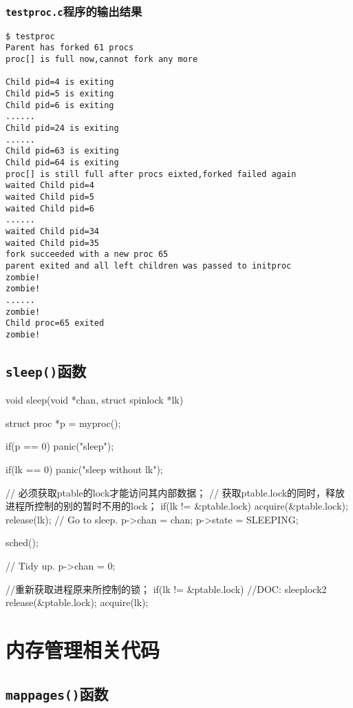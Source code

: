 \documentclass{swfuthesism}
\begin{document}
\subsubsection{\texttt{testproc.c}程序的输出结果}
\label{sec:testproc}

\begin{verbatim}
$ testproc
Parent has forked 61 procs
proc[] is full now,cannot fork any more

Child pid=4 is exiting
Child pid=5 is exiting
Child pid=6 is exiting
......
Child pid=24 is exiting
......
Child pid=63 is exiting
Child pid=64 is exiting
proc[] is still full after procs eixted,forked failed again
waited Child pid=4
waited Child pid=5
waited Child pid=6
......
waited Child pid=34
waited Child pid=35
fork succeeded with a new proc 65
parent exited and all left children was passed to initproc
zombie!
zombie!
......
zombie!
Child proc=65 exited
zombie!
\end{verbatim}

\subsection{\texttt{sleep()}函数}
\label{sec:sleep}

\begin{ccode}
void sleep(void *chan, struct spinlock *lk)
{
  struct proc *p = myproc();
  
  if(p == 0)
    panic("sleep");

  if(lk == 0)
    panic("sleep without lk");

  // 必须获取ptable的lock才能访问其内部数据；
  // 获取ptable.lock的同时，释放进程所控制的别的暂时不用的lock；
  if(lk != &ptable.lock){  
    acquire(&ptable.lock); 
    release(lk);
  }
  // Go to sleep.
  p->chan = chan;
  p->state = SLEEPING;

  sched();

  // Tidy up.
  p->chan = 0;

  //重新获取进程原来所控制的锁；
  if(lk != &ptable.lock){  //DOC: sleeplock2
    release(&ptable.lock);
    acquire(lk);
  }
}
\end{ccode}

\section{内存管理相关代码}
\subsection{\texttt{mappages()}函数}
\label{sec:mappages}
\end{document}
